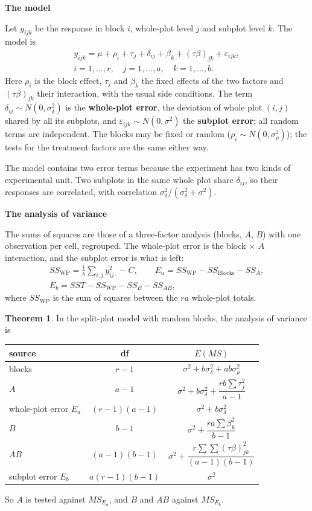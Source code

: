 \documentclass[11pt,a4paper]{article}
\numberwithin{equation}{section}
\theoremstyle{definition}
\newtheorem{thm}{Theorem}[subsection]
\newcommand{\subhead}[1]{%
  \par\medskip\noindent\textbf{#1}\par\nobreak\smallskip}
\begin{document}
\subhead{The model}
Let $y_{ijk}$ be the response in block $i$, whole-plot level $j$ and subplot level $k$. The model is
\begin{gather*}
y_{ijk} = \mu + \rho_i + \tau_j + \delta_{ij} + \beta_k + (\tau\beta)_{jk} + \varepsilon_{ijk} , \\
i = 1, \dots, r , \quad j = 1, \dots, a , \quad k = 1, \dots, b .
\end{gather*}
Here $\rho_i$ is the block effect, $\tau_j$ and $\beta_k$ the fixed effects of the two factors and $(\tau\beta)_{jk}$ their interaction, with the usual side conditions. The term
$\delta_{ij} \sim N(0, \sigma^2_\delta)$ is the \textbf{whole-plot error}, the deviation of whole plot $(i, j)$ shared by all its subplots, and $\varepsilon_{ijk} \sim N(0, \sigma^2)$ the \textbf{subplot error};
all random terms are independent. The blocks may be fixed or random ($\rho_i \sim N(0, \sigma^2_\rho)$); the tests for the treatment factors are the same either way.

The model contains two error terms because the experiment has two kinds of experimental unit. Two subplots in the same whole plot share $\delta_{ij}$,
so their responses are correlated, with correlation $\sigma^2_\delta/(\sigma^2_\delta + \sigma^2)$.

\subhead{The analysis of variance}
The sums of squares are those of a three-factor analysis (blocks, $A$, $B$) with one observation per cell, regrouped. The whole-plot error is the
block $\times$ $A$ interaction, and the subplot error is what is left:
\begin{gather*}
SS_{\mathrm{WP}} = \frac1b\sum_{i,j}y_{ij\cdot}^2 - C , \qquad E_a = SS_{\mathrm{WP}} - SS_{\mathrm{Blocks}} - SS_A , \\
E_b = SST - SS_{\mathrm{WP}} - SS_B - SS_{AB} ,
\end{gather*}
where $SS_{\mathrm{WP}}$ is the sum of squares between the $ra$ whole-plot totals.

\begin{thm}\label{thm:splitplot}
In the split-plot model with random blocks, the analysis of variance is
\begin{center}
\begin{tabular}{l|cc}
source & df & $E(MS)$ \\
\hline
blocks & $r - 1$ & $\sigma^2 + b\sigma^2_\delta + ab\sigma^2_\rho$ \\
$A$ & $a - 1$ & $\sigma^2 + b\sigma^2_\delta + \dfrac{rb\sum\tau_j^2}{a - 1}$ \\[1.5ex]
whole-plot error $E_a$ & $(r - 1)(a - 1)$ & $\sigma^2 + b\sigma^2_\delta$ \\
\hline
$B$ & $b - 1$ & $\sigma^2 + \dfrac{ra\sum\beta_k^2}{b - 1}$ \\[1.5ex]
$AB$ & $(a - 1)(b - 1)$ & $\sigma^2 + \dfrac{r\sum\sum(\tau\beta)_{jk}^2}{(a - 1)(b - 1)}$ \\[1.5ex]
subplot error $E_b$ & $a(r - 1)(b - 1)$ & $\sigma^2$
\end{tabular}
\end{center}
So $A$ is tested against $MS_{E_a}$, and $B$ and $AB$ against $MS_{E_b}$.
\end{thm}
\end{document}
